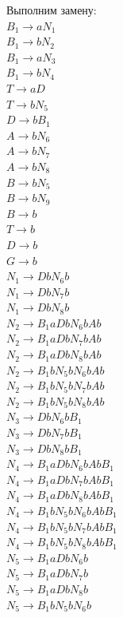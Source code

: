 \documentclass[a4paper,14pt]{extarticle}
\begin{document}
\begin{enumerate}[1.]
Выполним замену:\\
$B_1 \rightarrow aN_1$\\
$B_1 \rightarrow bN_2$\\
$B_1 \rightarrow aN_3$\\
$B_1 \rightarrow bN_4$\\
$T \rightarrow aD$\\ 
$T \rightarrow bN_5$\\
$D \rightarrow bB_1$\\
$A \rightarrow bN_6$\\
$A \rightarrow bN_7$\\
$A \rightarrow bN_8$\\
$B \rightarrow bN_5$\\ 
$B \rightarrow bN_9$\\ 
$B \rightarrow b$\\
$T \rightarrow b$\\
$D \rightarrow b$\\
$G \rightarrow b$\\
$N_1 \rightarrow DbN_6b$\\
$N_1 \rightarrow DbN_7b$\\
$N_1 \rightarrow DbN_8b$\\
$N_2 \rightarrow B_1aDbN_6bAb$\\
$N_2 \rightarrow B_1aDbN_7bAb$\\
$N_2 \rightarrow B_1aDbN_8bAb$\\
$N_2 \rightarrow B_1bN_5bN_6bAb$\\
$N_2 \rightarrow B_1bN_5bN_7bAb$\\
$N_2 \rightarrow B_1bN_5bN_8bAb$\\
$N_3 \rightarrow DbN_6bB_1$\\
$N_3 \rightarrow DbN_7bB_1$\\
$N_3 \rightarrow DbN_8bB_1$\\
$N_4 \rightarrow B_1aDbN_6bAbB_1$\\
$N_4 \rightarrow B_1aDbN_7bAbB_1$\\
$N_4 \rightarrow B_1aDbN_8bAbB_1$\\
$N_4 \rightarrow B_1bN_5bN_6bAbB_1$\\
$N_4 \rightarrow B_1bN_5bN_7bAbB_1$\\
$N_4 \rightarrow B_1bN_5bN_8bAbB_1$\\
$N_5 \rightarrow B_1aDbN_6b$\\
$N_5 \rightarrow B_1aDbN_7b$\\
$N_5 \rightarrow B_1aDbN_8b$\\
$N_5 \rightarrow B_1bN_5bN_6b$\\

\end{enumerate}
\end{document}
